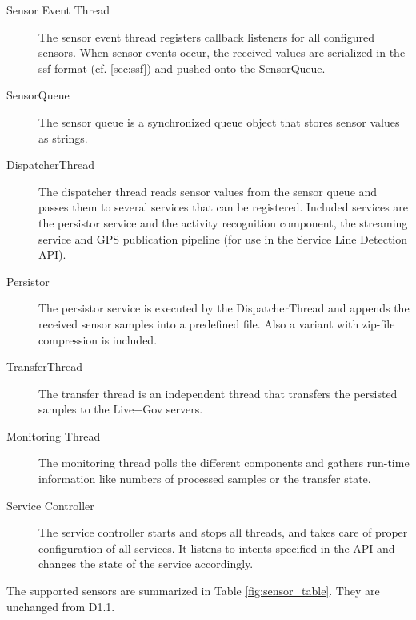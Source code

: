 \begin{description}
\item[Sensor Event Thread] The sensor event thread registers
  callback listeners for all configured sensors. When sensor events
  occur, the received values are serialized in the ssf
  format (cf. \ref{sec:ssf}) and pushed onto the SensorQueue.
\item[SensorQueue] The sensor queue is a synchronized queue
  object that stores sensor values as strings.
\item[DispatcherThread] The dispatcher thread reads sensor
  values from the sensor queue and passes them to several services
  that can be registered. Included services are the persistor service
  and the activity recognition component, the streaming service and GPS
  publication pipeline (for use in the Service Line Detection API).
\item[Persistor] The persistor service is executed by the
  DispatcherThread and appends the received sensor samples into a
  predefined file. Also a variant with zip-file compression is
  included.
\item[TransferThread] The transfer thread is an independent
  thread that transfers the persisted samples to the Live+Gov servers.
\item[Monitoring Thread] The monitoring thread polls the
  different components and gathers run-time information like numbers
  of processed samples or the transfer state.
\item[Service Controller] The service controller starts and
  stops all threads, and takes care of proper configuration of all
  services. It listens to intents specified in the API and changes the
  state of the service accordingly.
\end{description}

The supported sensors are summarized in Table
\ref{fig:sensor_table}. They are unchanged from D1.1.

